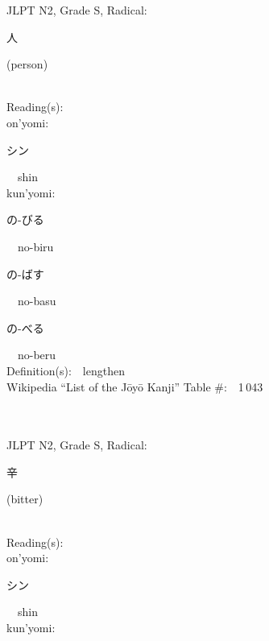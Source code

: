 \begin{multicols}{2}
{JLPT N2, Grade S, Radical:\ \ {\begin{CJK}{UTF8}{min} 人 \end{CJK}} (person) } \\
Reading(s):\ \ \\
{\hspace*{1em}}on'yomi:\ \ \\
{\hspace*{2em}}{\begin{CJK}{UTF8}{min} シン \end{CJK}}\ \ shin\ \ \\
{\hspace*{1em}}kun'yomi:\ \ \\
{\hspace*{2em}}{\begin{CJK}{UTF8}{min} の-びる \end{CJK}}\ \ no-biru\ \ \\
{\hspace*{2em}}{\begin{CJK}{UTF8}{min} の-ばす \end{CJK}}\ \ no-basu\ \ \\
{\hspace*{2em}}{\begin{CJK}{UTF8}{min} の-べる \end{CJK}}\ \ no-beru\ \ \\
Definition(s):\ \ lengthen \\
Wikipedia ``List of the J\=oy\=o Kanji'' Table \#:\ \ 1\,043 \\
\ \ \\
{\fontsize{34pt}{40pt}  }\ \ \\  %
{JLPT N2, Grade S, Radical:\ \ {\begin{CJK}{UTF8}{min} 辛 \end{CJK}} (bitter) } \\
Reading(s):\ \ \\
{\hspace*{1em}}on'yomi:\ \ \\
{\hspace*{2em}}{\begin{CJK}{UTF8}{min} シン \end{CJK}}\ \ shin\ \ \\
{\hspace*{1em}}kun'yomi:\ \ \\

\end{multicols}
